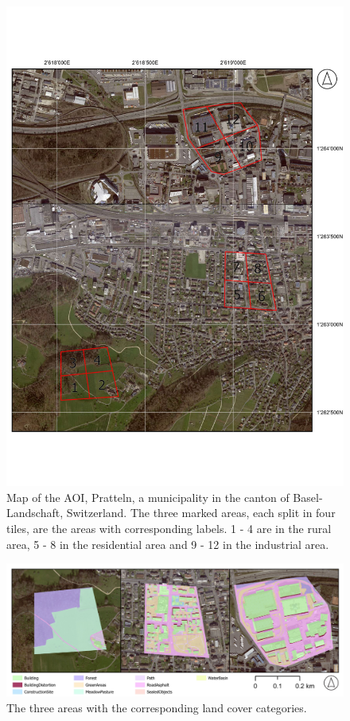 \begin{figure}[H]
    \centering
    \captionsetup{width=0.8\linewidth}
    \includegraphics[scale=0.9, trim=-1.1cm 2cm 0cm 2cm, clip]{figures/map_aoi.pdf}
    \caption{Map of the AOI, Pratteln, a  municipality in the canton of Basel-Landschaft, Switzerland. 
    The three marked areas, each split in four tiles, are the areas with corresponding labels. 1 - 4 are in the rural area,
    5 - 8 in the residential area and 9 - 12 in the industrial area.}
    \label{fig:aoi_labeled}
\end{figure}

\begin{figure}[H]
    \centering
    \captionsetup{width=0.8\linewidth}
    \includegraphics[width=\linewidth]{figures/map_aoi_category.pdf}
    \caption{The three areas with the corresponding land cover categories.}
    \label{fig:category_areas}
\end{figure}

